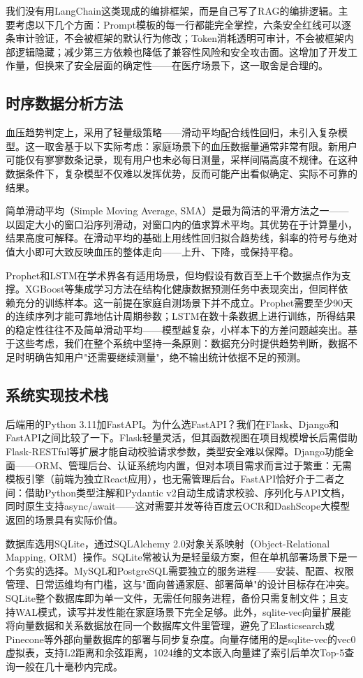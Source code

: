 \documentclass[zihao=-4,a4paper]{ctexart}
\begin{document}
我们没有用LangChain这类现成的编排框架，而是自己写了RAG的编排逻辑。主要考虑以下几个方面：Prompt模板的每一行都能完全掌控，六条安全红线可以逐条审计验证，不会被框架的默认行为修改；Token消耗透明可审计，不会被框架内部逻辑隐藏；减少第三方依赖也降低了兼容性风险和安全攻击面。这增加了开发工作量，但换来了安全层面的确定性——在医疗场景下，这一取舍是合理的。

\subsection{时序数据分析方法}

血压趋势判定上，采用了轻量级策略——滑动平均配合线性回归，未引入复杂模型。这一取舍基于以下实际考虑：家庭场景下的血压数据量通常非常有限。新用户可能仅有寥寥数条记录，现有用户也未必每日测量，采样间隔高度不规律。在这种数据条件下，复杂模型不仅难以发挥优势，反而可能产出看似确定、实际不可靠的结果。

简单滑动平均（Simple Moving Average, SMA）是最为简洁的平滑方法之一——以固定大小的窗口沿序列滑动，对窗口内的值求算术平均。其优势在于计算量小，结果高度可解释。在滑动平均的基础上用线性回归拟合趋势线，斜率的符号与绝对值大小即可大致反映血压的整体走向——上升、下降，或保持平稳。

Prophet和LSTM在学术界各有适用场景，但均假设有数百至上千个数据点作为支撑。XGBoost等集成学习方法在结构化健康数据预测任务中表现突出，但同样依赖充分的训练样本。这一前提在家庭自测场景下并不成立。Prophet需要至少90天的连续序列才能可靠地估计周期参数；LSTM在数十条数据上进行训练，所得结果的稳定性往往不及简单滑动平均——模型越复杂，小样本下的方差问题越突出。基于这些考虑，我们在整个系统中坚持一条原则：数据充分时提供趋势判断，数据不足时明确告知用户"还需要继续测量"，绝不输出统计依据不足的预测。

\subsection{系统实现技术栈}

后端用的Python 3.11加FastAPI。为什么选FastAPI？我们在Flask、Django和FastAPI之间比较了一下。Flask轻量灵活，但其函数视图在项目规模增长后需借助Flask-RESTful等扩展才能自动校验请求参数，类型安全难以保障。Django功能全面——ORM、管理后台、认证系统均内置，但对本项目需求而言过于繁重：无需模板引擎（前端为独立React应用），也无需管理后台。FastAPI恰好介于二者之间：借助Python类型注解和Pydantic v2自动生成请求校验、序列化与API文档，同时原生支持async/await——这对需要并发等待百度云OCR和DashScope大模型返回的场景具有实际价值。

数据库选用SQLite，通过SQLAlchemy 2.0对象关系映射（Object-Relational Mapping, ORM）操作。SQLite常被认为是轻量级方案，但在单机部署场景下是一个务实的选择。MySQL和PostgreSQL需要独立的服务进程——安装、配置、权限管理、日常运维均有门槛，这与"面向普通家庭、部署简单"的设计目标存在冲突。SQLite整个数据库即为单一文件，无需任何服务进程，备份只需复制文件；且支持WAL模式，读写并发性能在家庭场景下完全足够。此外，sqlite-vec向量扩展能将向量数据和关系数据放在同一个数据库文件里管理，避免了Elasticsearch或Pinecone等外部向量数据库的部署与同步复杂度。向量存储用的是sqlite-vec的vec0虚拟表，支持L2距离和余弦距离，1024维的文本嵌入向量建了索引后单次Top-5查询一般在几十毫秒内完成。
\end{document}

